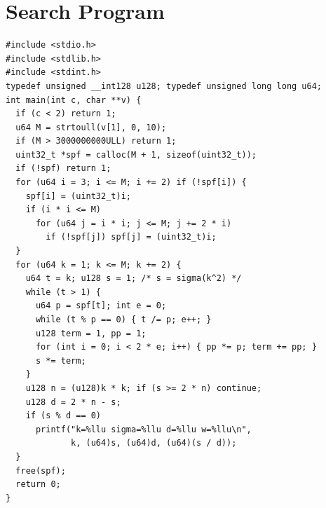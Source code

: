 \documentclass[11pt]{amsart}
\theoremstyle{definition}
\theoremstyle{remark}
\begin{document}
\appendix
\section{Search Program}\label{app:code}

\begin{lstlisting}
#include <stdio.h>
#include <stdlib.h>
#include <stdint.h>
typedef unsigned __int128 u128; typedef unsigned long long u64;
int main(int c, char **v) {
  if (c < 2) return 1;
  u64 M = strtoull(v[1], 0, 10);
  if (M > 3000000000ULL) return 1;
  uint32_t *spf = calloc(M + 1, sizeof(uint32_t));
  if (!spf) return 1;
  for (u64 i = 3; i <= M; i += 2) if (!spf[i]) {
    spf[i] = (uint32_t)i;
    if (i * i <= M)
      for (u64 j = i * i; j <= M; j += 2 * i)
        if (!spf[j]) spf[j] = (uint32_t)i;
  }
  for (u64 k = 1; k <= M; k += 2) {
    u64 t = k; u128 s = 1; /* s = sigma(k^2) */
    while (t > 1) {
      u64 p = spf[t]; int e = 0;
      while (t % p == 0) { t /= p; e++; }
      u128 term = 1, pp = 1;
      for (int i = 0; i < 2 * e; i++) { pp *= p; term += pp; }
      s *= term;
    }
    u128 n = (u128)k * k; if (s >= 2 * n) continue;
    u128 d = 2 * n - s;
    if (s % d == 0)
      printf("k=%llu sigma=%llu d=%llu w=%llu\n",
             k, (u64)s, (u64)d, (u64)(s / d));
  }
  free(spf);
  return 0;
}
\end{lstlisting}
\end{document}
